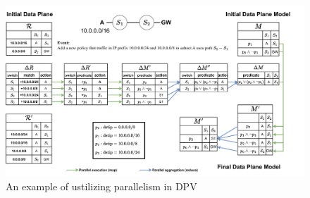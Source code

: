 \documentclass[final]{beamer}
\begin{document}
\begin{frame}[t]
\begin{columns}[t]
\begin{column}{\paperwidth}
\begin{figure}
\centering
\includegraphics[width=0.8\paperwidth]{figures/example.pdf}
\caption{An example of ustilizing parallelism in DPV}
\end{figure}
\end{column}
\end{columns}

\end{frame}
\end{document}

